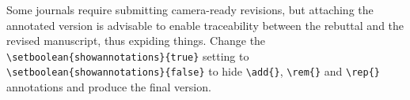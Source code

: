 \documentclass{article}
\begin{document}
Some journals require submitting camera-ready revisions, but attaching the annotated version is advisable to enable traceability between the rebuttal and the revised manuscript, thus expiding things. Change the \verb|\setboolean{showannotations}{true}| setting to \verb|\setboolean{showannotations}{false}| to hide \verb|\add{}|, \verb|\rem{}| and \verb|\rep{}| annotations and produce the final version.



\end{document}
